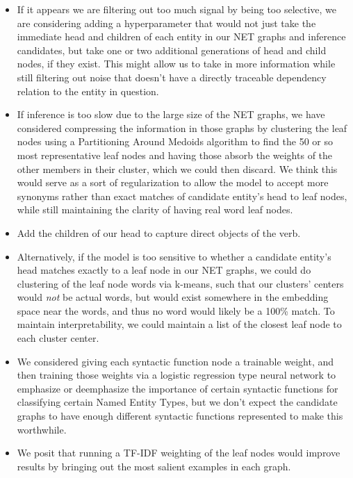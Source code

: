 \documentclass[11pt,a4paper]{article}
\begin{document}
\begin{itemize}

\item If it appears we are filtering out too much signal by being too selective, we are considering adding a hyperparameter that would not just take the immediate head and children of each entity in our NET graphs and inference candidates, but take one or two additional generations of head and child nodes, if they exist. This might allow us to take in more information while still filtering out noise that doesn't have a directly traceable dependency relation to the entity in question.

\item If inference is too slow due to the large size of the NET graphs, we have considered compressing the information in those graphs by clustering the leaf nodes using a Partitioning Around Medoids algorithm to find the 50 or so most representative leaf nodes and having those absorb the weights of the other members in their cluster, which we could then discard. We think this would serve as a sort of regularization to allow the model to accept more synonyms rather than exact matches of candidate entity's head to leaf nodes, while still maintaining the clarity of having real word leaf nodes.

\item Add the children of our head to capture direct objects of the verb.

\item Alternatively, if the model is too sensitive to whether a candidate entity's head matches exactly to a leaf node in our NET graphs, we could do clustering of the leaf node words via k-means, such that our clusters' centers would \textit{not} be actual words, but would exist somewhere in the embedding space near the words, and thus no word would likely be a 100\% match. To maintain interpretability, we could maintain a list of the closest leaf node to each cluster center.

\item We considered giving each syntactic function node a trainable weight, and then training those weights via a logistic regression type neural network to emphasize or deemphasize the importance of certain syntactic functions for classifying certain Named Entity Types, but we don't expect the candidate graphs to have enough different syntactic functions represented to make this worthwhile.

\item We posit that running a TF-IDF weighting of the leaf nodes would improve results by bringing out the most salient examples in each graph.


\end{itemize}
\end{document}
